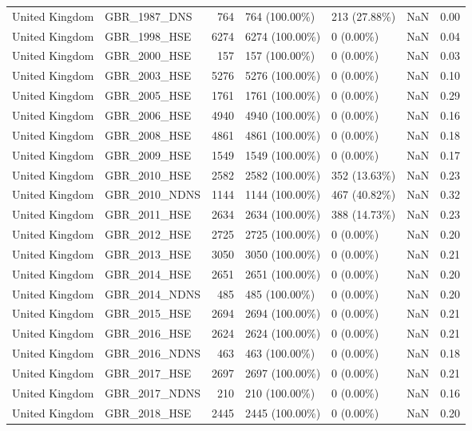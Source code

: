 \begin{longtable}{llrllrr}
\addlinespace
United Kingdom & GBR\_1987\_DNS & 764 & 764 (100.00\%) & 213 (27.88\%) & NaN & 0.00\\
United Kingdom & GBR\_1998\_HSE & 6274 & 6274 (100.00\%) & 0 (0.00\%) & NaN & 0.04\\
United Kingdom & GBR\_2000\_HSE & 157 & 157 (100.00\%) & 0 (0.00\%) & NaN & 0.03\\
United Kingdom & GBR\_2003\_HSE & 5276 & 5276 (100.00\%) & 0 (0.00\%) & NaN & 0.10\\
United Kingdom & GBR\_2005\_HSE & 1761 & 1761 (100.00\%) & 0 (0.00\%) & NaN & 0.29\\
United Kingdom & GBR\_2006\_HSE & 4940 & 4940 (100.00\%) & 0 (0.00\%) & NaN & 0.16\\
United Kingdom & GBR\_2008\_HSE & 4861 & 4861 (100.00\%) & 0 (0.00\%) & NaN & 0.18\\
United Kingdom & GBR\_2009\_HSE & 1549 & 1549 (100.00\%) & 0 (0.00\%) & NaN & 0.17\\
United Kingdom & GBR\_2010\_HSE & 2582 & 2582 (100.00\%) & 352 (13.63\%) & NaN & 0.23\\
United Kingdom & GBR\_2010\_NDNS & 1144 & 1144 (100.00\%) & 467 (40.82\%) & NaN & 0.32\\
United Kingdom & GBR\_2011\_HSE & 2634 & 2634 (100.00\%) & 388 (14.73\%) & NaN & 0.23\\
United Kingdom & GBR\_2012\_HSE & 2725 & 2725 (100.00\%) & 0 (0.00\%) & NaN & 0.20\\
United Kingdom & GBR\_2013\_HSE & 3050 & 3050 (100.00\%) & 0 (0.00\%) & NaN & 0.21\\
United Kingdom & GBR\_2014\_HSE & 2651 & 2651 (100.00\%) & 0 (0.00\%) & NaN & 0.20\\
United Kingdom & GBR\_2014\_NDNS & 485 & 485 (100.00\%) & 0 (0.00\%) & NaN & 0.20\\
United Kingdom & GBR\_2015\_HSE & 2694 & 2694 (100.00\%) & 0 (0.00\%) & NaN & 0.21\\
United Kingdom & GBR\_2016\_HSE & 2624 & 2624 (100.00\%) & 0 (0.00\%) & NaN & 0.21\\
United Kingdom & GBR\_2016\_NDNS & 463 & 463 (100.00\%) & 0 (0.00\%) & NaN & 0.18\\
United Kingdom & GBR\_2017\_HSE & 2697 & 2697 (100.00\%) & 0 (0.00\%) & NaN & 0.21\\
United Kingdom & GBR\_2017\_NDNS & 210 & 210 (100.00\%) & 0 (0.00\%) & NaN & 0.16\\
United Kingdom & GBR\_2018\_HSE & 2445 & 2445 (100.00\%) & 0 (0.00\%) & NaN & 0.20\\

\end{longtable}
